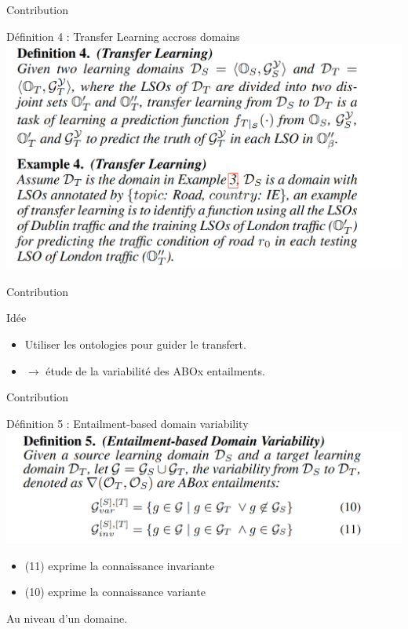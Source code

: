 \documentclass{beamer}
\begin{document}
\begin{frame}{Contribution}
\begin{block}{Définition 4 : Transfer Learning accross domains}
 \centering
    \includegraphics[scale=0.3]{Figures/TL.png}

\end{block}
\end{frame}


\begin{frame}{Contribution}
\begin{block}{Idée}
\begin{itemize}
    \item Utiliser les ontologies pour guider le transfert.
    \item $\rightarrow$ étude de la variabilité des ABOx entailments.
\end{itemize}
\end{block}

\end{frame}

\begin{frame}{Contribution}
\begin{block}{Définition 5 : Entailment-based domain variability}
 \centering
    \includegraphics[scale=0.3]{Figures/variability.png}
\end{block}
\begin{itemize}
    \item (11) exprime la connaissance invariante
    \item (10) exprime la connaissance variante
\end{itemize}
Au niveau d'un domaine.
\end{frame}
\end{document}
